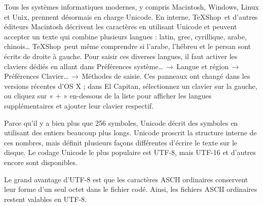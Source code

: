 \documentclass[11pt,french]{article}
\newcommand{\TS}{\textsf{\TeX Shop}}
\newcommand{\cmd}[1]{\textsf{#1}}
\newcommand{\To}{\,\(\to\)\,}
\begin{document}
Tous les systèmes informatiques modernes, y compris Macintosh, Windows, Linux et Unix, prennent désormais en charge Unicode. En interne, \TS\ et d'autres éditeurs Macintosh décrivent les caractères en utilisant Unicode et peuvent accepter un texte qui combine plusieurs langues : latin, grec, cyrillique, arabe, chinois… \TS\ peut même comprendre si l'arabe, l'hébreu et le persan sont écrits de droite à gauche. Pour saisir ces diverses langues, il faut activer les claviers dédiés en allant dans \cmd{Préférences système…}\To\cmd{Langue et région}\To\cmd{Préférences Clavier…}\To{Méthodes de saisie}. Ces panneaux ont changé dans les versions récentes d'OS X ; dans El Capitan, sélectionnez un clavier sur la gauche, ou cliquez sur « + » en-dessous de la liste pour afficher les langues supplémentaires et ajouter leur clavier respectif.

Parce qu'il y a bien plus que 256 symboles, Unicode décrit des symboles en utilisant des entiers beaucoup plus longs. Unicode proscrit la structure interne de ces nombres, mais définit plusieurs façons différentes d'écrire le texte sur le disque. Le codage Unicode le plus populaire est UTF-8, mais UTF-16 et d'autres encore sont disponibles.

Le grand avantage d'UTF-8 est que les caractères ASCII ordinaires conservent leur forme d'un seul octet dans le fichier codé. Ainsi, les fichiers ASCII ordinaires restent valables en UTF-8.
\end{document}

